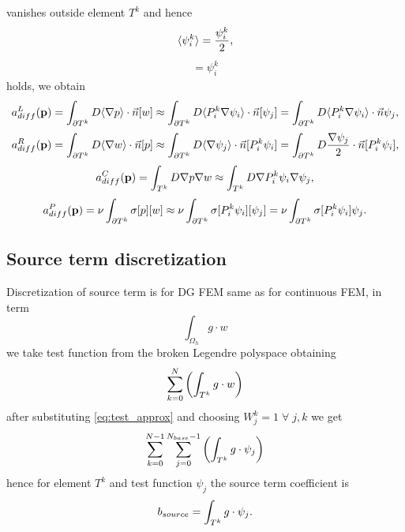 vanishes outside element $T^k$ and hence
\begin{eqnarray}
	\langle\psi^k_i\rangle = \frac{\psi^k_i}{2},
\end{eqnarray}
\begin{eqnarray}
    [\psi^k_i] = \psi^k_i
\end{eqnarray}
holds, we obtain
\begin{equation}\label{eq:diff_left_approx}
	a^L_{diff}(\mathbf{p}) = \int_{\partial T^k} D \langle\nabla p\rangle \cdot \vec{n} [w] \approx
		\int_{\partial T^k} D \langle P^k_i\nabla\psi_i\rangle \cdot \vec{n}[\psi_j] =
		\int_{\partial T^k} D \langle P^k_i\nabla\psi_i\rangle \cdot \vec{n}\psi_j,
\end{equation}
\begin{equation}\label{eq:diff_right_approx}
		a^R_{diff}(\mathbf{p}) =\int_{\partial T^k} D \langle\nabla w \rangle\cdot \vec{n} [p] \approx
			\int_{\partial T^k} D \langle\nabla \psi_j \rangle\cdot \vec{n} [P^k_i\psi_i] =
			\int_{\partial T^k} D \frac{\nabla \psi_j}{2}\cdot \vec{n} 
			[P^k_i\psi_i],
\end{equation}\label{eq:diff_laplace_approx}
\begin{equation}\label{key}
	a^C_{diff}(\mathbf{p})=\int_{T^k} D\nabla p \nabla w \approx
		\int_{T^k} D\nabla P^k_i\psi_i \nabla \psi_j,
\end{equation}
\begin{equation}\label{eq:diff_penalty_approx}
		a^P_{diff}(\mathbf{p})=\nu \int_{\partial T^k} \sigma [p][w] \approx
	 	\nu \int_{\partial T^k} \sigma [P^k_i\psi_i][\psi_j] 
	 	= \nu \int_{\partial T^k} \sigma [P^k_i\psi_i]\psi_j.
\end{equation}


\subsection{Source term discretization}
\label{se:source_term}
Discretization of source term is for DG FEM same as for continuous FEM, 
in term
\begin{equation}
	\int_{\Omega_h} g\cdot w
\end{equation}
we take test function from the broken Legendre polyspace obtaining 
\begin{equation}
	\sum\limits_{k=0}^{N}\left(\int_{T^k} g\cdot w\right)
\end{equation}
after substituting \eqref{eq:test_approx} and choosing $W_j^k = 1 \; \forall \; 
j, k$ we get
\begin{equation}
\sum\limits_{k=0}^{N - 1}\sum\limits_{j=0}^{N_{base} - 1}\left(\int_{T^k} g\cdot 
\psi_j \right)
\end{equation}
hence for element $T^k$ and test function $\psi_j$ the source term coefficient 
is
\begin{equation}
	b_{source} = \int_{T^k} g\cdot \psi_j.
\end{equation}

